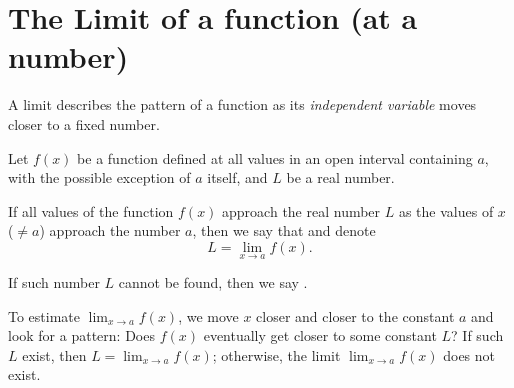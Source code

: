 \documentclass[../main.tex]{subfiles}
\begin{document}
 \section{The Limit of a function (at a number)}
  A limit describes the pattern of a function as its \emph{independent variable} moves closer to a fixed number.

  \begin{mdframed}[style=withref-compact]
    Let \(f(x)\) be a function defined at all values in an open interval containing \(a\), with the possible exception of \(a\) itself, and \(L\) be a real number. 

    If all values of the function \(f(x)\) approach the real number \(L\) as the values of \(x\) (\(\ne a\)) approach the number \(a\), then we say that  and denote
    \[
      L = \lim_{x \to a} f(x).
    \]

    If such number \(L\) cannot be found, then we say .

  \end{mdframed}

  \faLightbulb{} To estimate \(\lim_{x \to a} f(x)\), we move \(x\) closer and closer to the constant \(a\) \underline{\hspace{6cm}} and look for a pattern: Does \(f(x)\) eventually get \underline{\hspace{3cm}} closer to some constant \(L\)? If such \(L\) exist, then \(L = \lim_{x \to a} f(x)\); otherwise, the limit \(\lim_{x \to a}f(x)\) does not exist.
\end{document}
